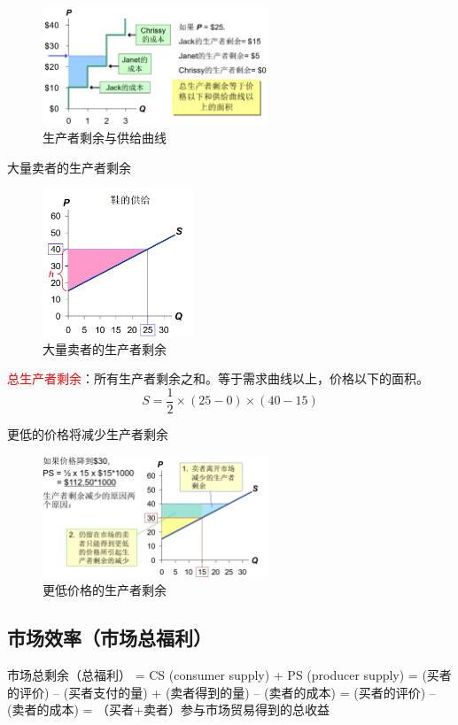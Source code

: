 \documentclass[12pt,a4paper]{article}
\begin{document}
\begin{figure}[H] 
  \centering %
  \includegraphics[width=0.6\textwidth]{生产者剩余与供给曲线.png} 
  \caption{生产者剩余与供给曲线} %
\end{figure}
大量卖者的生产者剩余
\begin{figure}[H] 
  \centering %
  \includegraphics[width=0.4\textwidth]{大量卖者的生产者剩余.png} 
  \caption{大量卖者的生产者剩余} %
\end{figure}
\textcolor{red}{总生产者剩余}：所有生产者剩余之和。等于需求曲线以上，价格以下的面积。
\[
S = \frac{1}{2} \times (25 - 0) \times (40 - 15)
\]

更低的价格将减少生产者剩余\\
\begin{figure}[H] 
  \centering %
  \includegraphics[width=0.6\textwidth]{更低价格的生产者剩余.png} 
  \caption{更低价格的生产者剩余} %
\end{figure}

\subsection{市场效率（市场总福利）}
市场总剩余（总福利） = CS (consumer supply) +  PS (producer supply)  =  (买者的评价) – (买者支付的量) + (卖者得到的量) – (卖者的成本) =  (买者的评价) – (卖者的成本) = （买者+卖者）参与市场贸易得到的总收益\\
\end{document}
